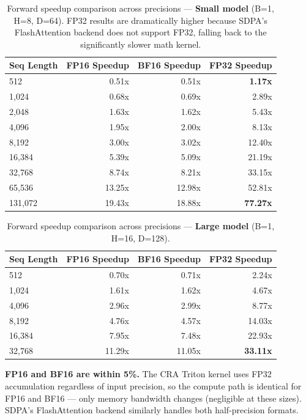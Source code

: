 \documentclass{article}
\begin{document}
    \begin{table}[h]
    \centering
    \caption{Forward speedup comparison across precisions --- \textbf{Small model} (B=1, H=8, D=64). FP32 results are dramatically higher because SDPA's FlashAttention backend does not support FP32, falling back to the significantly slower math kernel.}
    \begin{tabular}{lrrr}
    \toprule
    Seq Length & FP16 Speedup & BF16 Speedup & FP32 Speedup \\
    \midrule
    512 & 0.51x & 0.51x & \textbf{1.17x} \\
    1,024 & 0.68x & 0.69x & 2.89x \\
    2,048 & 1.63x & 1.62x & 5.43x \\
    4,096 & 1.95x & 2.00x & 8.13x \\
    8,192 & 3.00x & 3.02x & 12.40x \\
    16,384 & 5.39x & 5.09x & 21.19x \\
    32,768 & 8.74x & 8.21x & 33.15x \\
    65,536 & 13.25x & 12.98x & 52.81x \\
    131,072 & 19.43x & 18.88x & \textbf{77.27x} \\
    \bottomrule
    \end{tabular}
    \label{tab:precision_small}
    \end{table}

    \begin{table}[h]
    \centering
    \caption{Forward speedup comparison across precisions --- \textbf{Large model} (B=1, H=16, D=128).}
    \begin{tabular}{lrrr}
    \toprule
    Seq Length & FP16 Speedup & BF16 Speedup & FP32 Speedup \\
    \midrule
    512 & 0.70x & 0.71x & 2.24x \\
    1,024 & 1.61x & 1.62x & 4.67x \\
    4,096 & 2.96x & 2.99x & 8.77x \\
    8,192 & 4.76x & 4.57x & 14.03x \\
    16,384 & 7.95x & 7.48x & 22.93x \\
    32,768 & 11.29x & 11.05x & \textbf{33.11x} \\
    \bottomrule
    \end{tabular}
    \label{tab:precision_large}
    \end{table}

    \textbf{FP16 and BF16 are within 5\%.} The CRA Triton kernel uses FP32 accumulation regardless of input precision, so the compute path is identical for FP16 and BF16 --- only memory bandwidth changes (negligible at these sizes). SDPA's FlashAttention backend similarly handles both half-precision formats.
\end{document}
